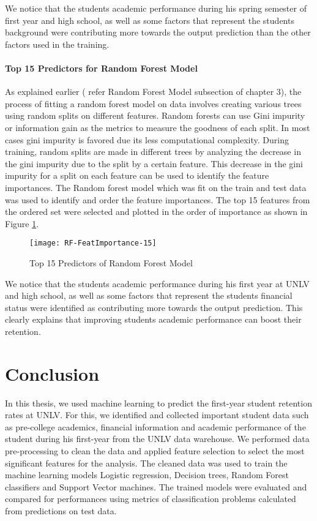 \documentclass[11pt,openright]{report}
\begin{document}
We notice that the students academic performance during his spring semester of first year and high school, as well as some factors that represent the students background were contributing more towards the output prediction than the other factors used in the training.

\subsubsection{Top 15 Predictors for Random Forest Model}

As explained earlier ( refer Random Forest Model subsection of chapter 3), the process of fitting a random forest model on data involves creating various trees using random splits on different features. Random forests can use Gini impurity or information gain as the metrics to measure the goodness of each split. In most cases gini impurity is favored due its less computational complexity. During training, random splits are made in different trees by analyzing the decrease in the gini impurity due to the split by a certain feature. This decrease in the gini impurity for a split on each feature can be used to identify the feature importances. The Random forest model which was fit on the train and test data was used to identify and order the feature importances. The top 15 features from the ordered set were selected and plotted in the order of importance as shown in Figure \ref{fig:rf_predictors}.

 \begin{figure}
	\centering
	\texttt{[image: RF-FeatImportance-15]}
	\caption{Top 15 Predictors of Random Forest Model}
	\label{fig:rf_predictors}
\end{figure} 

We notice that the students academic performance during his first year at UNLV and high school, as well as some factors that represent the students financial status were identified as contributing more towards the output prediction. This clearly explains that improving students academic performance can boost their retention.


\chapter{Conclusion} \label{chapter:conclusion}

In this thesis, we used machine learning to predict the first-year student retention rates at UNLV. For this, we identified and collected important student data such as pre-college academics, financial information and academic performance of the student during his first-year from the UNLV data warehouse. We performed data pre-processing to clean the data and applied feature selection to select the most significant features for the analysis. The cleaned data was used to train the machine learning models Logistic regression, Decision trees, Random Forest classifiers and Support Vector machines. The trained models were evaluated and compared for performances using metrics of classification problems calculated from predictions on test data. 
\end{document}
